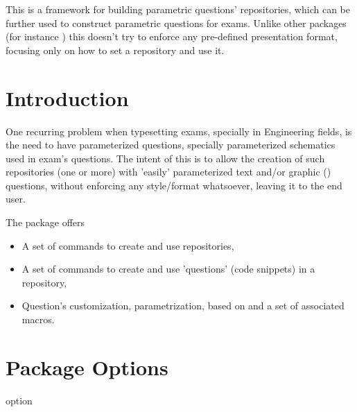 \documentclass[10pt]{article}
\begin{document}
  
\begin{typesetabstract}

This is a framework for building parametric questions' repositories, which can be further used to construct parametric questions for exams. Unlike other packages (for instance ) this doesn't try to enforce any pre-defined presentation format, focusing only on how to set a repository and use it.
\end{typesetabstract}

\tableofcontents



\section{Introduction}
One recurring problem when typesetting exams, specially in Engineering fields, is the need to have parameterized questions, specially parameterized schematics used in exam's questions. The intent of this is to allow the creation of such repositories (one or more) with 'easily' parameterized text and/or graphic () questions, without enforcing any style/format whatsoever, leaving it to the end user.

The package offers
\begin{itemize}
  \item A set of commands to create and use repositories,
  \item A set of commands to create and use 'questions' (code snippets) in a repository,
  \item Question's customization, parametrization, based on  and a set of associated macros.
\end{itemize}

\section{Package Options}\label{package options}
\begin{describelist}{option}
\end{describelist}
\end{document}

